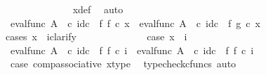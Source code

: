 \begin{isabellebody}
\ \ \ \ \ \ \ \ \ \ \ \ \isamarkupfalse%
\ x{\isacharunderscore}{\kern0pt}def\ \isamarkupfalse%
\ auto\isanewline
\ \ \ \ \ \ \ \ \ \ \isamarkupfalse%
\ {\isachardoublequoteopen}{\isacharparenleft}{\kern0pt}eval{\isacharunderscore}{\kern0pt}func\ A\ {\isasymOmega}\ {\isasymcirc}\isactrlsub c\ id\isactrlsub c\ {\isasymOmega}\ {\isasymtimes}\isactrlsub f\ f{\isacharparenright}{\kern0pt}\ {\isasymcirc}\isactrlsub c\ x\ {\isacharequal}{\kern0pt}\ {\isacharparenleft}{\kern0pt}eval{\isacharunderscore}{\kern0pt}func\ A\ {\isasymOmega}\ {\isasymcirc}\isactrlsub c\ id\isactrlsub c\ {\isasymOmega}\ {\isasymtimes}\isactrlsub f\ g{\isacharparenright}{\kern0pt}\ {\isasymcirc}\isactrlsub c\ x{\isachardoublequoteclose}\isanewline
\ \ \ \ \ \ \ \ \ \ \isamarkupfalse%
{\isacharparenleft}{\kern0pt}cases\ {\isachardoublequoteopen}{\isacharparenleft}{\kern0pt}x\ {\isacharequal}{\kern0pt}\ {\isasymlangle}{\isasymf}{\isacharcomma}{\kern0pt}i{\isasymrangle}{\isacharparenright}{\kern0pt}{\isachardoublequoteclose}{\isacharcomma}{\kern0pt}clarify{\isacharparenright}{\kern0pt}\isanewline
\ \ \ \ \ \ \ \ \ \ \ \ \isamarkupfalse%
\ case{}{\isacharcolon}{\kern0pt}\ {\isachardoublequoteopen}x\ {\isacharequal}{\kern0pt}\ {\isasymlangle}{\isasymf}{\isacharcomma}{\kern0pt}i{\isasymrangle}{\isachardoublequoteclose}\isanewline
\ \ \ \ \ \ \ \ \ \ \ \ \isamarkupfalse%
\ {\isachardoublequoteopen}{\isacharparenleft}{\kern0pt}eval{\isacharunderscore}{\kern0pt}func\ A\ {\isasymOmega}\ {\isasymcirc}\isactrlsub c\ {\isacharparenleft}{\kern0pt}id\isactrlsub c\ {\isasymOmega}\ {\isasymtimes}\isactrlsub f\ f{\isacharparenright}{\kern0pt}{\isacharparenright}{\kern0pt}\ {\isasymcirc}\isactrlsub c\ {\isasymlangle}{\isasymf}{\isacharcomma}{\kern0pt}i{\isasymrangle}\ {\isacharequal}{\kern0pt}\ eval{\isacharunderscore}{\kern0pt}func\ A\ {\isasymOmega}\ {\isasymcirc}\isactrlsub c\ {\isacharparenleft}{\kern0pt}{\isacharparenleft}{\kern0pt}id\isactrlsub c\ {\isasymOmega}\ {\isasymtimes}\isactrlsub f\ f{\isacharparenright}{\kern0pt}\ {\isasymcirc}\isactrlsub c\ {\isasymlangle}{\isasymf}{\isacharcomma}{\kern0pt}i{\isasymrangle}{\isacharparenright}{\kern0pt}{\isachardoublequoteclose}\isanewline
\ \ \ \ \ \ \ \ \ \ \ \ \ \ \isamarkupfalse%
\ case{}\ comp{\isacharunderscore}{\kern0pt}associative{}\ x{\isacharunderscore}{\kern0pt}type\ \isamarkupfalse%
\ {\isacharparenleft}{\kern0pt}typecheck{\isacharunderscore}{\kern0pt}cfuncs{\isacharcomma}{\kern0pt}\ auto{\isacharparenright}{\kern0pt}\isanewline

\end{isabellebody}
